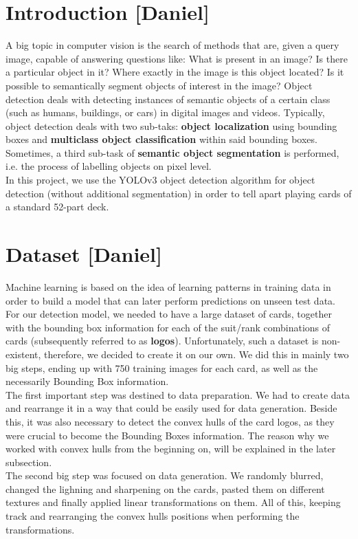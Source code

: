 \documentclass[a4paper]{article}
\begin{document}
\section{Introduction [Daniel]}
A big topic in computer vision is the search of methods that are, given a query image, capable of answering questions like: What is present in an image? Is there a particular object in it? Where exactly in the image is this object located? Is it possible to semantically segment objects of interest in the image?
Object detection deals with detecting instances of semantic objects of a certain class (such as humans, buildings, or cars) in digital images and videos. Typically, object detection deals with two sub-taks: \textbf{object localization} using bounding boxes and \textbf{multiclass object classification} within said bounding boxes.
Sometimes, a third sub-task of \textbf{semantic object segmentation} is performed, i.e. the process of labelling objects on pixel level.\\
In this project, we use the YOLOv3 object detection algorithm \cite{DBLP:journals/corr/abs-1804-02767} for object detection (without additional segmentation) in order to tell apart playing cards of a standard 52-part deck.
\newpage
\section{Dataset [Daniel]}
Machine learning is based on the idea of learning patterns in training data in order to build a model that can later perform predictions on unseen test data. For our detection model, we needed to have a large dataset of cards, together with the bounding box information for each of the suit/rank combinations of cards (subsequently referred to as \textbf{logos}).  Unfortunately, such a dataset is non-existent, therefore, we decided to create it on our own.  We did this in mainly two big steps, ending up with 750 training images for each card, as well as the necessarily Bounding Box information.   \\
The first important step was destined to data preparation.  We had to create data and rearrange it in a way that could be easily used for data generation.  Beside this, it was also necessary to detect the convex hulls of the card logos, as they were crucial to become the Bounding Boxes information.  The reason why we worked with convex hulls from the beginning on, will be explained in the later subsection.\\
The second big step was focused on data generation. We randomly blurred, changed the lighning and sharpening on the cards, pasted them on different textures and finally applied linear transformations on them.  All of this, keeping track and rearranging the convex hulls positions when performing the transformations.
\end{document}
